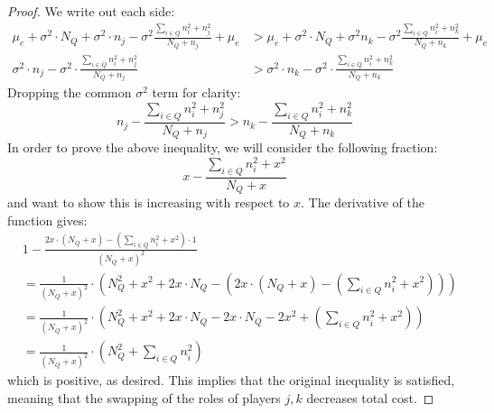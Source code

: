 \documentclass{article}
\newcommand{\p}[1]{\left( #1 \right)}
\newcommand{\cd}[0]{\cdot}
\newcommand{\mue}[0]{\ensuremath{\mu_e}}
\newcommand{\var}[0]{\ensuremath{\sigma^2}}
\newcommand{\ndraw}[0]{\ensuremath{n}}
\newcommand{\total}[0]{\ensuremath{N}}
\begin{document}
\swap*

\begin{proof}
We write out each side: 
\begin{align*}
\mue + \var \cd \total_Q + \var \cd \ndraw_j - \var \frac{\sum_{i \in Q} \ndraw_i^2 + \ndraw_j^2}{\total_Q + \ndraw_j} + \mue &> \mue + \var \cd \total_Q + \var \ndraw_k - \var \frac{\sum_{i \in Q}\ndraw_i^2 + \ndraw_k^2}{\total_Q + \ndraw_k} + \mue   \\
 \var \cd \ndraw_j - \var\cd  \frac{\sum_{i \in Q} \ndraw_i^2 + \ndraw_j^2}{\total_Q + \ndraw_j} &> \var \cd \ndraw_k - \var \cd \frac{\sum_{i \in Q}\ndraw_i^2 + \ndraw_k^2}{\total_Q + \ndraw_k}
\end{align*}
Dropping the common $\var$ term for clarity: 
$$ \ndraw_j -  \frac{\sum_{i \in Q} \ndraw_i^2 + \ndraw_j^2}{\total_Q + \ndraw_j} > \ndraw_k - \frac{\sum_{i \in Q}\ndraw_i^2 + \ndraw_k^2}{\total_Q + \ndraw_k}$$
In order to prove the above inequality, we will consider the following fraction:
$$x-  \frac{\sum_{i \in Q} \ndraw_i^2 + x^2}{\total_Q + x}$$
and want to show this is increasing with respect to $x$. The derivative of the function gives:
\begin{align*}
&1 - \frac{2x \cd (\total_Q + x) - (\sum_{i \in Q} \ndraw_i^2 +x^2) \cd 1}{(\total_Q + x)^2} \\
&=\frac{1}{(\total_Q + x)^2}\cd \p{\total_Q^2 + x^2 + 2 x\cd \total_Q - \p{2x \cd (\total_Q + x) - \p{\sum_{i \in Q} \ndraw_i^2 +x^2}}}\\
&=\frac{1}{(\total_Q + x)^2}\cd \p{\total_Q^2 + x^2 + 2 x\cd \total_Q - 2x \cd \total_Q - 2x^2 + \p{\sum_{i \in Q} \ndraw_i^2 +x^2} }\\
&=\frac{1}{(\total_Q + x)^2}\cd \p{\total_Q^2+ \sum_{i \in Q} \ndraw_i^2 }
\end{align*}
which is positive, as desired. This implies that the original inequality is satisfied, meaning that the swapping of the roles of players $j, k$ decreases total cost. 
\end{proof}


\orderjoin*
\end{document}
